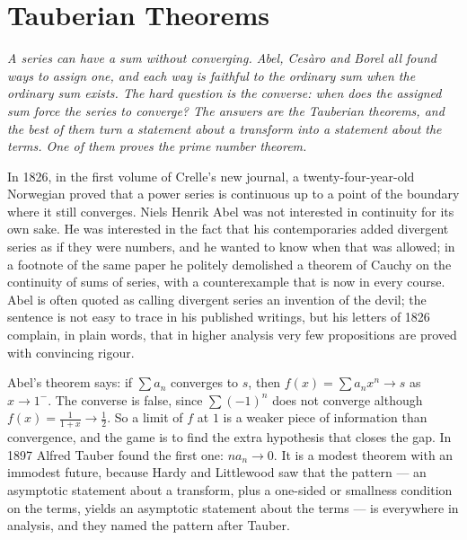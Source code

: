 \chapter{Tauberian Theorems}

\begin{center}\itshape
A series can have a sum without converging. Abel, Ces\`aro and Borel all found ways to assign one, and each way is faithful to the ordinary sum when the
ordinary sum exists. The hard question is the converse: when does the assigned sum force the series to converge? The answers are the Tauberian theorems,
and the best of them turn a statement about a transform into a statement about the terms. One of them proves the prime number theorem.
\end{center}

In 1826, in the first volume of Crelle's new journal, a twenty-four-year-old Norwegian proved that a power series is continuous up to a point of the
boundary where it still converges. Niels Henrik Abel was not interested in continuity for its own sake. He was interested in the fact that his
contemporaries added divergent series as if they were numbers, and he wanted to know when that was allowed; in a footnote of the same paper he politely
demolished a theorem of Cauchy on the continuity of sums of series, with a counterexample that is now in every course. Abel is often quoted as calling
divergent series an invention of the devil; the sentence is not easy to trace in his published writings, but his letters of 1826 complain, in plain words,
that in higher analysis very few propositions are proved with convincing rigour.

Abel's theorem says: if $\sum a_n$ converges to $s$, then $f(x)=\sum a_nx^n\to s$ as $x\to1^-$. The converse is false, since $\sum(-1)^n$ does not converge
although $f(x)=\frac1{1+x}\to\frac12$. So a limit of $f$ at $1$ is a weaker piece of information than convergence, and the game is to find the extra
hypothesis that closes the gap. In 1897 Alfred Tauber found the first one: $na_n\to0$. It is a modest theorem with an immodest future, because Hardy and
Littlewood saw that the pattern --- an asymptotic statement about a transform, plus a one-sided or smallness condition on the terms, yields an asymptotic
statement about the terms --- is everywhere in analysis, and they named the pattern after Tauber.

